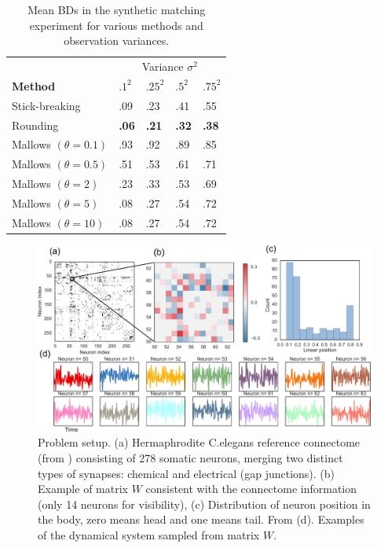 \documentclass[twoside]{article}
\begin{document}
 \begin{table}[h]
  \caption{Mean BDs in the synthetic matching experiment for various methods and observation variances.}
  \label{table:BDs}
  \centering
  \begin{tabular}{lllll}
    & \multicolumn{4}{c}{Variance $\sigma^2$} \\
    \cmidrule(lr){3-4} 
    \textbf{Method} & $.1^2$ & $.25^2$ & $.5^2$ & $.75^2$ \\
    \hline
    Stick-breaking & .09 & .23 & .41 & .55 \\
    Rounding & \textbf{.06} & \textbf{.21}  & \textbf{.32}  & \textbf{.38} \\
    Mallows $(\theta=0.1)$ & .93 & .92 & .89  & .85 \\
    Mallows $(\theta=0.5)$ & .51 & .53  & .61 & .71 \\
    Mallows $(\theta=2)$ & .23 & .33 & .53  & .69 \\
    Mallows $(\theta=5)$ & .08 & .27 & .54 & .72 \\
    Mallows $(\theta=10)$ & .08 & .27 & .54  & .72 \\
    \bottomrule
  \end{tabular}
\end{table}

\begin{figure}[ht]
  \centering
  \includegraphics[width=6in]{../figures/figure6.pdf} 
  \caption{Problem setup. (a) Hermaphrodite C.elegans reference
    connectome (from \cite{varshney2011structural,wormatlas})
    consisting of 278 somatic neurons, merging two distinct types of
    synapses: chemical and electrical (gap junctions). (b) Example of
    matrix $W$ consistent with the connectome information (only 14
    neurons for visibility), (c) Distribution of neuron position in
    the body, zero means head and one means tail. From
    \cite{white1986structure,wormatlas} (d). Examples of the dynamical
    system sampled from matrix $W$.}
  \vspace{-1em}
  \label{fig:connectome}
\end{figure}
\end{document}
